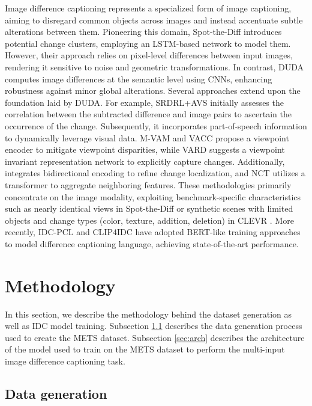 \documentclass[10pt,twocolumn,letterpaper]{article}
\begin{document}
Image difference captioning represents a specialized form of image captioning, aiming to disregard common objects across images and instead accentuate subtle alterations between them. Pioneering this domain, Spot-the-Diff \cite{spot-the-diff} introduces potential change clusters, employing an LSTM-based network to model them. However, their approach relies on pixel-level differences between input images, rendering it sensitive to noise and geometric transformations. In contrast, DUDA \cite{DUDA} computes image differences at the semantic level using CNNs, enhancing robustness against minor global alterations. Several approaches extend upon the foundation laid by DUDA. For example, SRDRL+AVS \cite{sem} initially assesses the correlation between the subtracted difference and image pairs to ascertain the occurrence of the change. Subsequently, it incorporates part-of-speech information to dynamically leverage visual data. M-VAM \cite{M-VAM} and VACC \cite{kim2021agnostic} propose a viewpoint encoder to mitigate viewpoint disparities, while VARD \cite{VARD} suggests a viewpoint invariant representation network to explicitly capture changes. Additionally, \cite{sun2022bidirectional} integrates bidirectional encoding to refine change localization, and NCT \cite{NCT} utilizes a transformer to aggregate neighboring features. These methodologies primarily concentrate on the image modality, exploiting benchmark-specific characteristics such as nearly identical views in Spot-the-Diff \cite{spot-the-diff} or synthetic scenes with limited objects and change types (color, texture, addition, deletion) in CLEVR \cite{DUDA}. More recently, IDC-PCL \cite{IDC} and CLIP4IDC \cite{CLIP4IDC} have adopted BERT-like training approaches to model difference captioning language, achieving state-of-the-art performance.

\section{Methodology}
\label{sec:method}

In this section, we describe the methodology behind the dataset generation as well as IDC model training.
Subsection \ref{sec:data} describes the data generation process used to create
the METS dataset. Subsection \ref{sec:arch} describes the architecture 
of the model used to train on the METS dataset to perform the multi-input image
difference captioning task.


\subsection{Data generation}
\label{sec:data}
\end{document}
